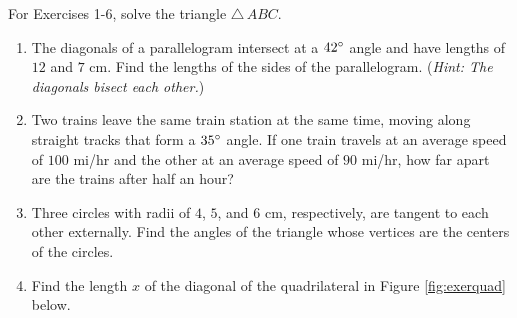 {\small
\par\noindent For Exercises 1-6, solve the triangle $\triangle\,ABC$.
\begin{enumerate}[\bfseries 1.]
 \item The diagonals of a parallelogram intersect at a $42^\circ$ angle and have lengths
 of $12$ and $7$ cm. Find the lengths of the sides of the parallelogram. (\emph{Hint: The
 diagonals bisect each other.})
 \item Two trains leave the same train station at the same time, moving along straight tracks that
 form a $35^\circ$ angle. If one train travels at an average speed of $100$ mi/hr and the other
 at an average speed of $90$ mi/hr, how far apart are the trains after half an hour?
 \item Three circles with radii of $4$, $5$, and $6$ cm, respectively, are tangent to each
 other externally. Find the angles of the triangle whose vertices are the centers of the circles.
 \item\label{exer:quad} Find the length $x$ of the diagonal of the quadrilateral in Figure
  \ref{fig:exerquad} below.
\begin{figure}[h]
\begin{minipage}[t]{7.5cm}
 \begin{center}
  \vspace{-5mm}

\end{center}
\end{minipage}
\end{figure}
\end{enumerate}}
